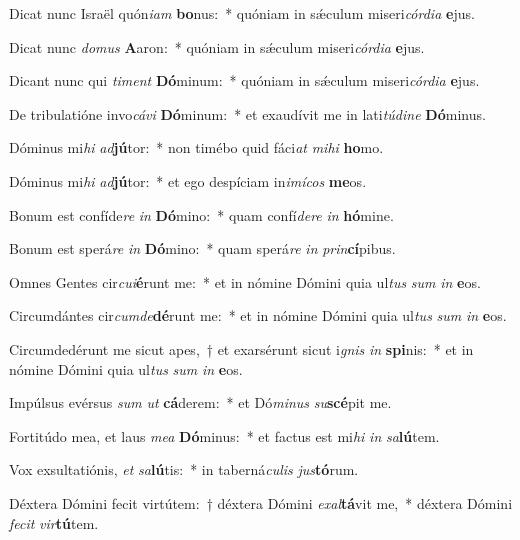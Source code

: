 \item Dicat nunc Israël quón\textit{i}\textit{am} \textbf{bo}nus:~* quóniam in sǽculum miseri\textit{cór}\textit{di}\textit{a} \textbf{e}jus.
\item Dicat nunc \textit{do}\textit{mus} \textbf{A}aron:~* quóniam in sǽculum miseri\textit{cór}\textit{di}\textit{a} \textbf{e}jus.
\item Dicant nunc qui \textit{ti}\textit{ment} \textbf{Dó}minum:~* quóniam in sǽculum miseri\textit{cór}\textit{di}\textit{a} \textbf{e}jus.
\item De tribulatióne invo\textit{cá}\textit{vi} \textbf{Dó}minum:~* et exaudívit me in lati\textit{tú}\textit{di}\textit{ne} \textbf{Dó}minus.
\item Dóminus mi\textit{hi} \textit{ad}\textbf{jú}tor:~* non timébo quid fáci\textit{at} \textit{mi}\textit{hi} \textbf{ho}mo.
\item Dóminus mi\textit{hi} \textit{ad}\textbf{jú}tor:~* et ego despíciam in\textit{i}\textit{mí}\textit{cos} \textbf{me}os.
\item Bonum est confíde\textit{re} \textit{in} \textbf{Dó}mino:~* quam confí\textit{de}\textit{re} \textit{in} \textbf{hó}mine.
\item Bonum est sperá\textit{re} \textit{in} \textbf{Dó}mino:~* quam sperá\textit{re} \textit{in} \textit{prin}\textbf{cí}pibus.
\item Omnes Gentes cir\textit{cu}\textit{i}\textbf{é}runt me:~* et in nómine Dómini quia ul\textit{tus} \textit{sum} \textit{in} \textbf{e}os.
\item Circumdántes cir\textit{cum}\textit{de}\textbf{dé}runt me:~* et in nómine Dómini quia ul\textit{tus} \textit{sum} \textit{in} \textbf{e}os.
\item Circumdedérunt me sicut apes,~† et exarsérunt sicut i\textit{gnis} \textit{in} \textbf{spi}nis:~* et in nómine Dómini quia ul\textit{tus} \textit{sum} \textit{in} \textbf{e}os.
\item Impúlsus evérsus \textit{sum} \textit{ut} \textbf{cá}derem:~* et Dó\textit{mi}\textit{nus} \textit{su}\textbf{scé}pit me.
\item Fortitúdo mea, et laus \textit{me}\textit{a} \textbf{Dó}minus:~* et factus est mi\textit{hi} \textit{in} \textit{sa}\textbf{lú}tem.
\item Vox exsultatiónis, \textit{et} \textit{sa}\textbf{lú}tis:~* in taberná\textit{cu}\textit{lis} \textit{jus}\textbf{tó}rum.
\item Déxtera Dómini fecit virtútem:~† déxtera Dómini \textit{ex}\textit{al}\textbf{tá}vit me,~* déxtera Dómini \textit{fe}\textit{cit} \textit{vir}\textbf{tú}tem.
